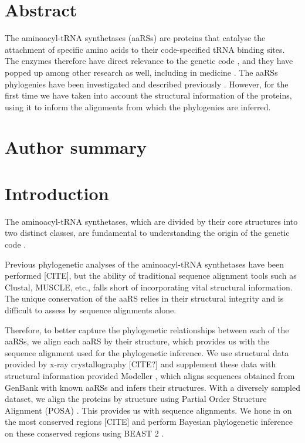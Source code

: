 \documentclass[10pt,letterpaper]{article}
\begin{document}
\section*{Abstract}
The aminoacyl-tRNA synthetases (aaRSs) are proteins that catalyse the attachment of specific amino acids to their code-specified tRNA binding sites.  The enzymes therefore have direct relevance to the genetic code \cite{Woese}, and they have popped up 
among other research as well, including in medicine \cite{MalariaProlyl}.
The aaRSs phylogenies have been investigated and described previously \cite{aaRSphylogeny1999} \cite{aaRSphylogeny2017}.  However, for the first time we have taken into account the structural information of the proteins, using it to inform the alignments from which the phylogenies are inferred.

\section*{Author summary}

\linenumbers

\section*{Introduction}
The aminoacyl-tRNA synthetases, which are divided by their core structures into two distinct classes, are fundamental to understanding the origin of the genetic code \cite{Woese}.

Previous phylogenetic analyses of the aminoacyl-tRNA synthetases have been performed [CITE], but the ability of traditional sequence alignment tools such as Clustal, MUSCLE, etc., falls short of 
incorporating vital structural information.  The unique conservation of the aaRS relies in their structural integrity and is difficult to assess by sequence alignments alone.  

Therefore, to better capture the phylogenetic relationships between each of the aaRSs, we align each aaRS by their structure, which provides us with the sequence alignment used for the phylogenetic inference.  
We use structural data provided by x-ray crystallography [CITE?] and supplement these data with structural information provided Modeller \cite{Modeller}, which aligns sequences obtained from GenBank with known aaRSs and infers their structures.
With a diversely sampled dataset, we align the proteins by structure using Partial Order Structure Alignment (POSA) \cite{POSA} \cite{POSA1}.  This provides us with sequence alignments.  We hone in on the most conserved regions [CITE] and perform 
Bayesian phylogenetic inference on these conserved regions using BEAST 2 \cite{BEAST2}.
\end{document}

